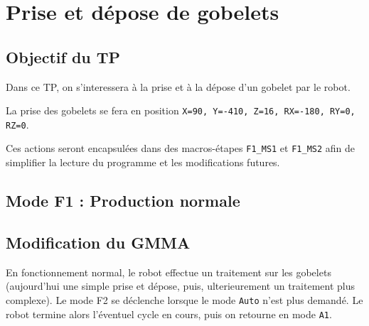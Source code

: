 \section{Prise et dépose de gobelets}
\subsection{Objectif du TP}

Dans ce TP, on s'interessera à la prise et à la dépose d'un gobelet par le robot. 


La prise des gobelets se fera en position \texttt{X=90, Y=-410, Z=16, RX=-180, RY=0, RZ=0}.

Ces actions seront encapsulées dans des macros-étapes \texttt{F1\_MS1} et \texttt{F1\_MS2} afin de simplifier la lecture du programme et les modifications futures.

\subsection{Mode F1 : Production normale}

\subsection{Modification du GMMA}
En fonctionnement normal, le robot effectue un traitement sur les gobelets (aujourd'hui une simple prise et dépose, puis, ulterieurement un traitement plus complexe). Le mode F2 se déclenche lorsque le mode \texttt{Auto} n'est plus demandé. Le robot termine alors l'éventuel cycle en cours, puis on retourne en mode \texttt{A1}.
\begin{UPSTIPreparation}
    \vspace{2.7cm}
\end{UPSTIPreparation}